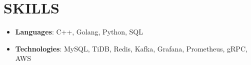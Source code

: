\documentclass[letterpaper,11pt]{article}
\newcommand{\resumeItem}[2]{
  \item\small{
    \textbf{#1}{: #2 \vspace{-2pt}}
  }
}
\newcommand{\resumeSubItem}[2]{\resumeItem{#1}{#2}\vspace{-4pt}}
\newcommand{\resumeSubHeadingListStart}{\begin{itemize}[leftmargin=*]}
\newcommand{\resumeSubHeadingListEnd}{\end{itemize}}
\begin{document}


\section{SKILLS}
  \resumeSubHeadingListStart
    \resumeSubItem{Languages}
      {C++, Golang, Python, SQL}
    \resumeSubItem{Technologies}
      { MySQL, TiDB, Redis, Kafka, Grafana, Prometheus, gRPC, AWS}
  \resumeSubHeadingListEnd

\end{document}
